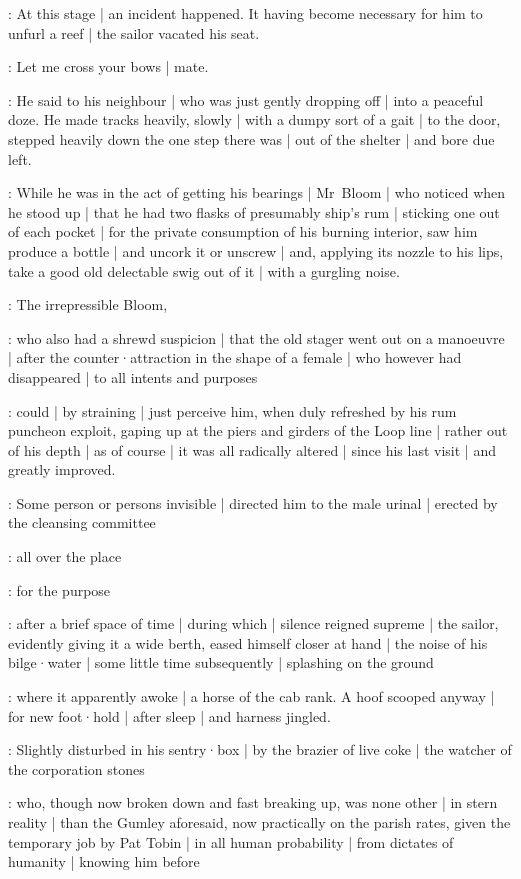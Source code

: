 :
At this stage |
an incident happened.
It having become necessary for him to unfurl a reef |
the sailor vacated his seat.

\Murphy:
Let me cross your bows |
mate.%

:
He said to his neighbour |
who was just gently dropping off |
into a peaceful doze.
He made tracks heavily,
slowly |
with a dumpy sort of a gait |
to the door,
stepped heavily down the one step there was |
out of the shelter |
and bore due left.

:
While he was in the act of getting his bearings |
Mr~Bloom |
who noticed when he stood up |
that he had two flasks of presumably ship's rum |
sticking one out of each pocket |
for the private consumption of his burning interior,
saw him produce a bottle |
and uncork it or unscrew |
and,
applying its nozzle to his lips,
take a good old delectable swig out of it |
with a gurgling noise.

:
The irrepressible Bloom,

:
who also had a shrewd suspicion |
that the old stager went out on a manoeuvre |
after the counter·attraction in the shape of a female |
who however had disappeared |
to all intents and purposes

:
could |
by straining |
just perceive him,
when duly refreshed by his rum puncheon exploit,
gaping up at the piers and girders of the Loop line |
rather out of his depth |
as of course |
it was all radically altered |
since his last visit |
and greatly improved.

:
Some person or persons invisible |
directed him to the male urinal |
erected by the cleansing committee

:
all over the place

:
for the purpose

:
after a brief space of time |
during which |
silence reigned supreme |
the sailor,
evidently giving it a wide berth,
eased himself closer at hand |
the noise of his bilge·water |
some little time subsequently |
splashing on the ground

:
where it apparently awoke |
a horse of the cab rank.
A hoof scooped anyway |
for new foot·hold |
after sleep |
and harness jingled.

:
Slightly disturbed in his sentry·box |
by the brazier of live coke |
the watcher of the corporation stones

:
who,
though now broken down and fast breaking up,
was none other |
in stern reality |
than the Gumley aforesaid,
now practically on the parish rates,
given the temporary job by Pat Tobin |
in all human probability |
from dictates of humanity |
knowing him before

